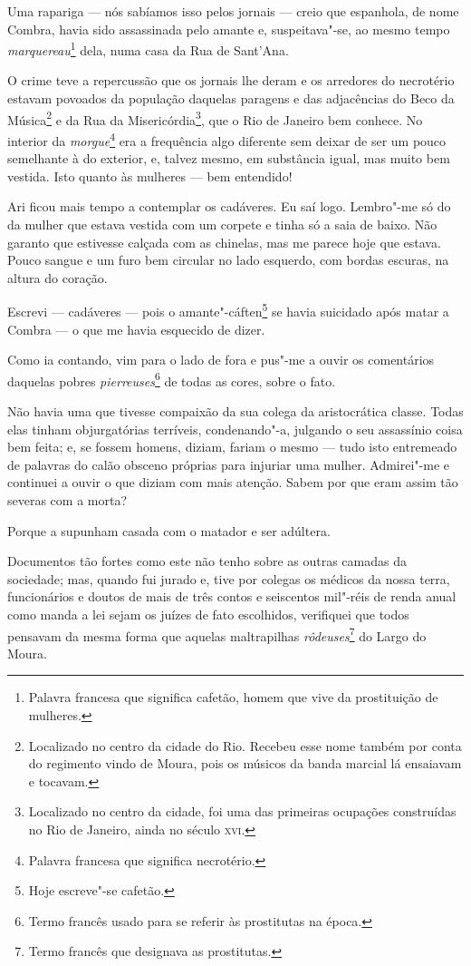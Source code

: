 Uma rapariga --- nós sabíamos isso pelos jornais --- creio que espanhola,
de nome Combra, havia sido assassinada pelo amante e, suspeitava"-se, ao
mesmo tempo \emph{marquereau}\footnote{Palavra francesa que significa
  cafetão, homem que vive da prostituição de mulheres.} dela, numa casa
da Rua de Sant'Ana.

O crime teve a repercussão que os jornais lhe deram e os arredores do
necrotério estavam povoados da população daquelas paragens e das
adjacências do Beco da Música\footnote{Localizado no centro da cidade do
  Rio. Recebeu esse nome também por conta do regimento vindo de Moura,
  pois os músicos da banda marcial lá ensaiavam e tocavam.} e da Rua da
Misericórdia\footnote{Localizado no centro da cidade, foi uma das
  primeiras ocupações construídas no Rio de Janeiro, ainda no século
  \textsc{xvi}.}, que o Rio de Janeiro bem conhece. No interior da
\emph{morgue}\footnote{Palavra francesa que significa necrotério.} era a
frequência algo diferente sem deixar de ser um pouco semelhante à do
exterior, e, talvez mesmo, em substância igual, mas muito bem vestida.
Isto quanto às mulheres --- bem entendido!

Ari ficou mais tempo a contemplar os cadáveres. Eu saí logo. Lembro"-me
só do da mulher que estava vestida com um corpete e tinha só a saia de
baixo. Não garanto que estivesse calçada com as chinelas, mas me parece
hoje que estava. Pouco sangue e um furo bem circular no lado esquerdo,
com bordas escuras, na altura do coração.

Escrevi --- cadáveres --- pois o amante"-cáften\footnote{Hoje escreve"-se
  cafetão.} se havia suicidado após matar a Combra --- o que me havia
esquecido de dizer.

Como ia contando, vim para o lado de fora e pus"-me a ouvir os
comentários daquelas pobres \emph{pierreuses}\footnote{Termo francês
  usado para se referir às prostitutas na época.} de todas as cores,
sobre o fato.

Não havia uma que tivesse compaixão da sua colega da aristocrática
classe. Todas elas tinham objurgatórias terríveis, condenando"-a,
julgando o seu assassínio coisa bem feita; e, se fossem homens, diziam,
fariam o mesmo --- tudo isto entremeado de palavras do calão obsceno
próprias para injuriar uma mulher. Admirei"-me e continuei a ouvir o que
diziam com mais atenção. Sabem por que eram assim tão severas com a
morta?

Porque a supunham casada com o matador e ser adúltera.

Documentos tão fortes como este não tenho sobre as outras camadas da
sociedade; mas, quando fui jurado e, tive por colegas os médicos da
nossa terra, funcionários e doutos de mais de três contos e seiscentos
mil"-réis de renda anual como manda a lei sejam os juízes de fato
escolhidos, verifiquei que todos pensavam da mesma forma que aquelas
maltrapilhas \emph{rôdeuses}\footnote{Termo francês que designava as
  prostitutas.} do Largo do Moura.

